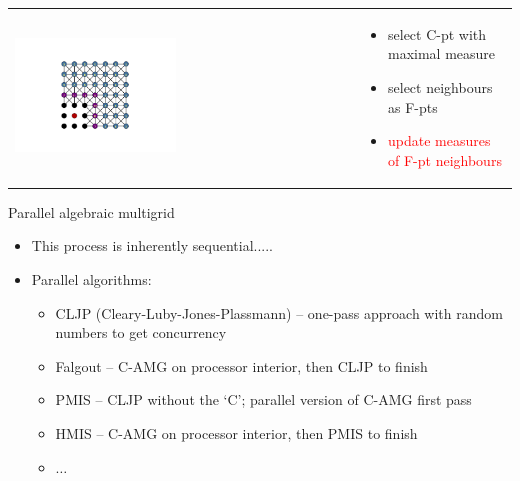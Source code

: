 \documentclass[12pt]{beamer}
\newcommand{\re}[1]{{\textcolor{red}       {#1}}}
\begin{document}
\begin{frame}


\begin{tabular}{ p{} p{}}

\hspace{5mm} \includegraphics[trim = 85mm 40mm 85mm  40mm, clip, width=0.48\textwidth]{AMG4.png} &

\vspace{-1.75in}

\begin{itemize}
  \item select C-pt with maximal measure
  \item select neighbours as F-pts
  \item \re{update measures of F-pt neighbours}

\end{itemize}

\end{tabular}

\end{frame}
\begin{frame}{Parallel algebraic multigrid}
\begin{itemize}
  \item This process is inherently sequential.....
  \item Parallel algorithms:
  \begin{itemize}
    \item CLJP (Cleary-Luby-Jones-Plassmann) – one-pass approach with random numbers to get concurrency
    \item Falgout – C-AMG on processor interior, then CLJP to finish
    \item PMIS – CLJP without the `C'; parallel version of C-AMG first pass
    \item HMIS – C-AMG on processor interior, then PMIS to finish
    \item $\ldots$
  \end{itemize}
\end{itemize}



\end{frame}
\end{document}
